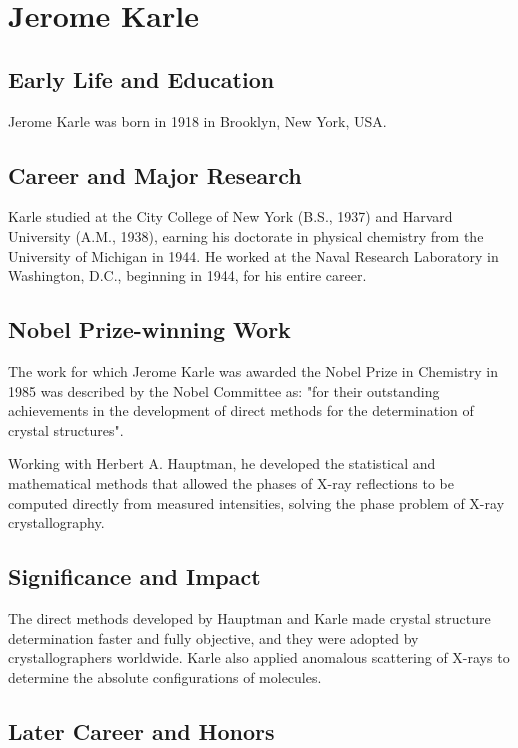 \clearpage

\section{Jerome Karle}

\subsection*{Early Life and Education}

Jerome Karle was born in 1918 in Brooklyn, New York, USA.

\subsection*{Career and Major Research}

Karle studied at the City College of New York (B.S., 1937) and Harvard University (A.M., 1938), earning his doctorate in physical chemistry from the University of Michigan in 1944. He worked at the Naval Research Laboratory in Washington, D.C., beginning in 1944, for his entire career.

\subsection*{Nobel Prize-winning Work}

The work for which Jerome Karle was awarded the Nobel Prize in Chemistry in 1985 was described by the Nobel Committee as: "for their outstanding achievements in the development of direct methods for the determination of crystal structures".

Working with Herbert A. Hauptman, he developed the statistical and mathematical methods that allowed the phases of X-ray reflections to be computed directly from measured intensities, solving the phase problem of X-ray crystallography.

\subsection*{Significance and Impact}

The direct methods developed by Hauptman and Karle made crystal structure determination faster and fully objective, and they were adopted by crystallographers worldwide. Karle also applied anomalous scattering of X-rays to determine the absolute configurations of molecules.

\subsection*{Later Career and Honors}

